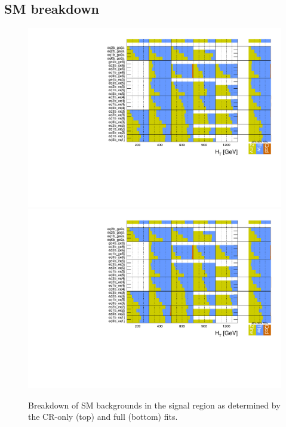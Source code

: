 \clearpage
\subsection{SM breakdown}

\begin{figure}[h!]
  \centering
  \caption{Breakdown of SM backgrounds in the signal region as
    determined by the CR-only (top) and full (bottom) fits.}
  \label{fig:breakdown}
  \includegraphics[width=0.8\linewidth]{figures/results/36invfb/breakdown/crfit/Signal_sample_composition.pdf}\\
  \includegraphics[width=0.8\linewidth]{figures/results/36invfb/breakdown/postfit/Signal_sample_composition.pdf}
\end{figure}

